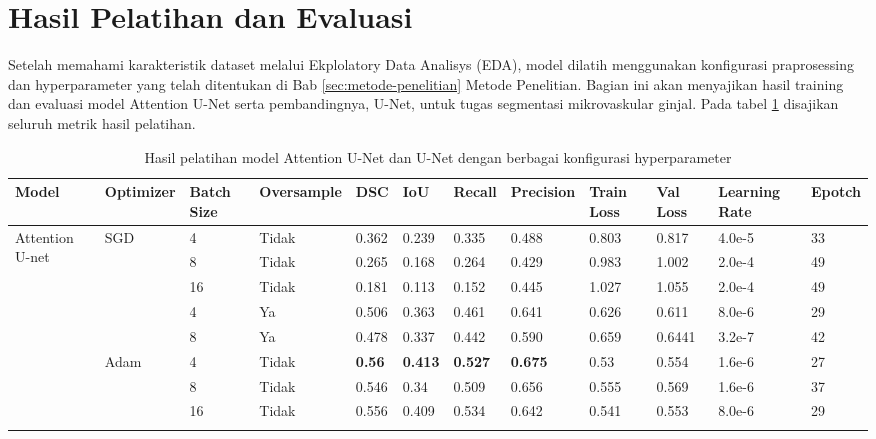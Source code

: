 \section{Hasil Pelatihan dan Evaluasi}
\noindent Setelah memahami karakteristik dataset melalui Ekplolatory Data Analisys (EDA), model dilatih menggunakan konfigurasi praprosessing dan hyperparameter yang telah ditentukan di Bab \ref{sec:metode-penelitian} Metode Penelitian. Bagian ini akan menyajikan hasil training dan evaluasi model Attention U-Net serta pembandingnya, U-Net, untuk tugas segmentasi mikrovaskular ginjal. Pada tabel \ref{tab:training-results} disajikan seluruh metrik hasil pelatihan.

\begin{landscape}
\begin{table}[]
	\caption{Hasil pelatihan model Attention U-Net dan U-Net dengan berbagai konfigurasi hyperparameter}
	\label{tab:training-results}
	\begin{tabular}{@{}llllllllllll@{}}
		\toprule
		Model &
		Optimizer &
		Batch Size &
		Oversample &
		DSC &
		IoU &
		Recall &
		Precision &
		Train Loss &
		Val Loss &
		Learning Rate &
		Epotch \\ \midrule
		\multirow{10}{*}{Attention U-net} &
		\multirow{5}{*}{SGD} &
		4 &
		Tidak &
		0.362 &
		0.239 &
		0.335 &
		0.488 &
		0.803 &
		0.817 &
		4.0e-5 &
		33 \\
		&  & 8  & Tidak & 0.265          & 0.168          & 0.264          & 0.429          & 0.983 & 1.002  & 2.0e-4 & 49 \\
		&  & 16 & Tidak & 0.181          & 0.113          & 0.152          & 0.445          & 1.027 & 1.055  & 2.0e-4 & 49 \\ \cmidrule(l){3-12} 
		&  & 4  & Ya    & 0.506          & 0.363          & 0.461          & 0.641          & 0.626 & 0.611  & 8.0e-6 & 29 \\
		&  & 8  & Ya    & 0.478          & 0.337          & 0.442          & 0.590          & 0.659 & 0.6441 & 3.2e-7 & 42 \\ \cmidrule(l){2-12} 
		&
		\multirow{5}{*}{Adam} &
		4 &
		Tidak &
		\textbf{0.56} &
		\textbf{0.413} &
		\textbf{0.527} &
		\textbf{0.675} &
		0.53 &
		0.554 &
		1.6e-6 &
		27 \\
		&  & 8  & Tidak & 0.546          & 0.34           & 0.509          & 0.656          & 0.555 & 0.569  & 1.6e-6 & 37 \\
		&  & 16 & Tidak & 0.556          & 0.409          & 0.534          & 0.642          & 0.541 & 0.553  & 8.0e-6 & 29 \\ \cmidrule(l){3-12} 

\end{tabular}
\end{table}
\end{landscape}
